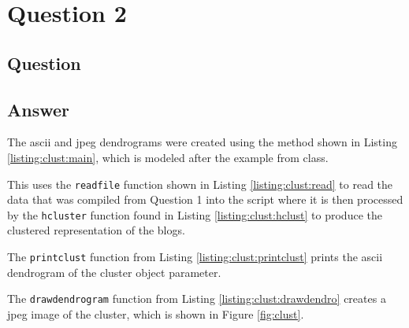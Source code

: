 \section{Question 2}

\subsection{Question}


\subsection{Answer}
The ascii and jpeg dendrograms were created using the method shown in Listing \ref{listing:clust:main}, which is modeled after the example from class. 



This uses the {\tt readfile} function shown in Listing \ref{listing:clust:read} to read the data that was compiled from Question 1 into the script where it is then processed by the {\tt hcluster} function found in Listing \ref{listing:clust:hclust} to produce the clustered representation of the blogs.





The {\tt printclust} function from Listing \ref{listing:clust:printclust} prints the ascii dendrogram of the cluster object parameter.



The {\tt drawdendrogram} function from Listing \ref{listing:clust:drawdendro} creates a jpeg image of the cluster, which is shown in Figure \ref{fig:clust}.



